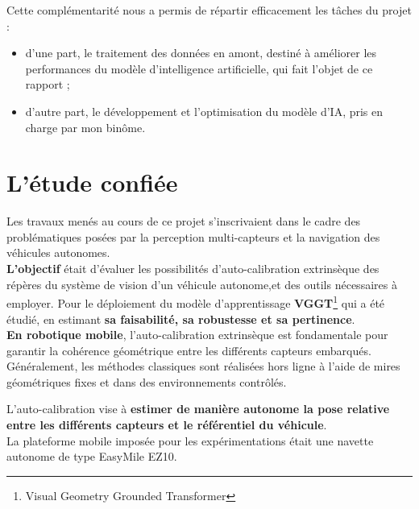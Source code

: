 \documentclass[12pt,a4paper,oneside]{report}
\begin{document}
Cette complémentarité nous a permis de répartir efficacement les tâches du projet : \vspace{0.05cm}

\begin{itemize}[label=\textbullet, itemsep=0.5em, leftmargin=2cm]
    \item d'une part, le traitement des données en amont, destiné à améliorer les performances du modèle d'intelligence artificielle, qui fait l'objet de ce rapport ;
    \item d'autre part, le développement et l'optimisation du modèle d'IA, pris en charge par mon binôme.
\end{itemize}

\newpage

\section{L'étude confiée}

\hspace*{0.3cm}Les travaux menés au cours de ce projet s'inscrivaient dans le cadre des problématiques posées par la perception multi-capteurs et la navigation des véhicules autonomes.\\

\hspace*{.3cm}\textbf{L'objectif} était d'évaluer les possibilités d'auto-calibration extrinsèque des répères du système de vision d'un véhicule autonome,et des outils nécessaires à employer. Pour le déploiement du modèle d'apprentissage \textbf{VGGT}\footnote{Visual Geometry Grounded Transformer} qui a été étudié, en estimant \textbf{sa faisabilité, sa robustesse et sa pertinence}.\\

\textbf{En robotique mobile}, l'auto-calibration extrinsèque est fondamentale pour garantir la cohérence géométrique entre les différents capteurs embarqués.\\
Généralement, les méthodes classiques sont réalisées hors ligne à l'aide de mires géométriques fixes et dans des environnements contrôlés.\vspace{0.1cm}

\hspace*{.5cm}L'auto-calibration vise à \textbf{estimer de manière autonome la pose relative entre les différents capteurs et le référentiel du véhicule}.\\

La plateforme mobile imposée pour les expérimentations était une navette autonome de type EasyMile EZ10.\vspace{0.1cm}
\end{document}
